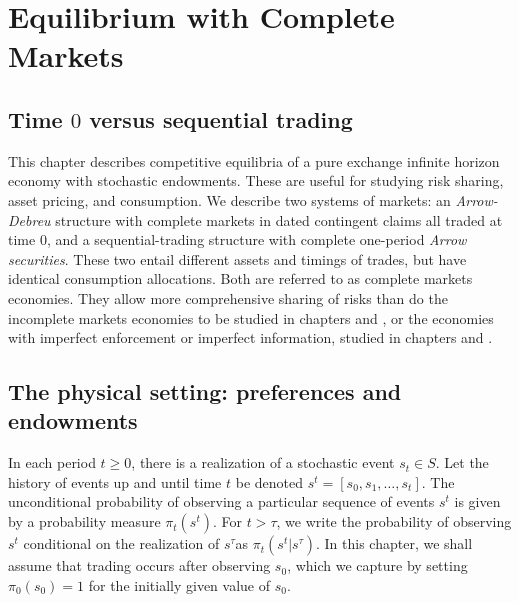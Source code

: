 
%


%


%


\chapter{Equilibrium with Complete Markets\label{recurge}}

\section{Time $0$ versus sequential trading}
 This chapter describes competitive   equilibria
of a pure exchange infinite horizon economy with stochastic
endowments.  These are  useful for studying risk sharing,
asset pricing, and consumption.       We describe two systems of markets:  an {\it Arrow-Debreu\/} structure with complete
markets in dated contingent claims all traded at time $0$,
%
 and a
sequential-trading structure with complete one-period {\it Arrow
securities\/}.
These two entail different assets  and timings of
trades, but have identical consumption allocations.
Both are referred to as complete markets
economies.  They allow more comprehensive sharing of risks
than do the incomplete markets economies to be
studied in chapters  and , or the economies
with imperfect enforcement or imperfect information, studied  in chapters
 and .




\section{The physical setting: preferences and endowments}
In each period $t\geq 0$, there is a realization of a stochastic
event $s_t \in S$. Let the history of events up and until time $t$
be denoted $s^t = [s_0, s_1, \ldots, s_t]$. The unconditional
probability of observing a particular sequence of events $s^t$ is
given by a probability measure $\pi_t(s^t)$. For $t > \tau$, we write the probability
of observing $s^t$ conditional on the realization of $s^\tau$as $\pi_t(s^t\vert s^\tau)$.
In this chapter, we shall assume that trading occurs after
observing $s_0$,
which we capture by setting $\pi_0(s_0)=1$ for the initially
given value of $s_0$.

